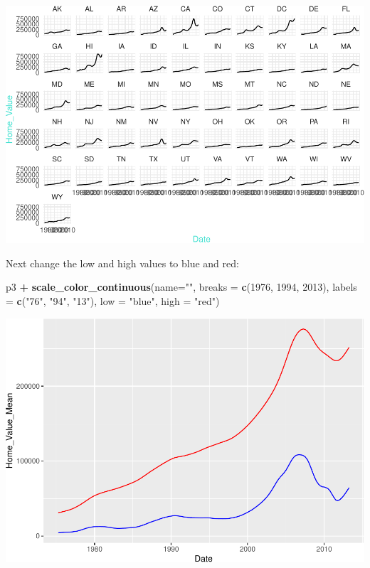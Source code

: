\documentclass[
]{book}
\newenvironment{Shaded}{\begin{snugshade}}{\end{snugshade}}
\newcommand{\DataTypeTok}[1]{\textcolor[rgb]{0.13,0.29,0.53}{#1}}
\newcommand{\DecValTok}[1]{\textcolor[rgb]{0.00,0.00,0.81}{#1}}
\newcommand{\KeywordTok}[1]{\textcolor[rgb]{0.13,0.29,0.53}{\textbf{#1}}}
\newcommand{\NormalTok}[1]{#1}
\newcommand{\OperatorTok}[1]{\textcolor[rgb]{0.81,0.36,0.00}{\textbf{#1}}}
\newcommand{\StringTok}[1]{\textcolor[rgb]{0.31,0.60,0.02}{#1}}
\begin{document}
\includegraphics{R/Rgraphics/figures/unnamed-chunk-184-1.pdf}

Next change the low and high values to blue and red:

\begin{Shaded}
\begin{Highlighting}[]
\NormalTok{p3 }\OperatorTok{+}
\StringTok{  }\KeywordTok{scale\_color\_continuous}\NormalTok{(}\DataTypeTok{name=}\StringTok{""}\NormalTok{,}
                         \DataTypeTok{breaks =} \KeywordTok{c}\NormalTok{(}\DecValTok{1976}\NormalTok{, }\DecValTok{1994}\NormalTok{, }\DecValTok{2013}\NormalTok{),}
                         \DataTypeTok{labels =} \KeywordTok{c}\NormalTok{(}\StringTok{"\textquotesingle{}76"}\NormalTok{, }\StringTok{"\textquotesingle{}94"}\NormalTok{, }\StringTok{"\textquotesingle{}13"}\NormalTok{),}
                         \DataTypeTok{low =} \StringTok{"blue"}\NormalTok{, }\DataTypeTok{high =} \StringTok{"red"}\NormalTok{)}
\end{Highlighting}
\end{Shaded}

\includegraphics{R/Rgraphics/figures/unnamed-chunk-185-1.pdf}
\end{document}
